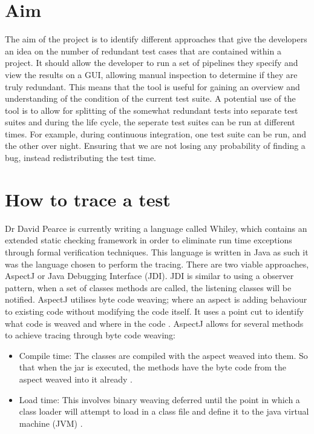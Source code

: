 \section{Aim}

The aim of the project is to identify different approaches that give the developers an idea on the number of redundant test cases that are contained within a project. It should allow the developer to run a set of pipelines they specify and view the results on a GUI, allowing manual inspection to determine if they are truly redundant. This means that the tool is useful for gaining an overview and understanding of the condition of the current test suite. A potential use of the tool is to allow for splitting of the somewhat redundant tests into separate test suites and during the life cycle, the seperate test suites can be run at different times. For example, during continuous integration, one test suite can be run, and the other over night. Ensuring that we are not losing any probability of finding a bug, instead redistributing the test time.

\section{How to trace a test}
Dr David Pearce is currently writing a language called Whiley, which contains an extended static checking framework in order to eliminate run time exceptions through formal verification techniques. This language is written in Java as such it was the language chosen to perform the tracing. There are two viable approaches, AspectJ or Java Debugging Interface (JDI). JDI is similar to using a observer pattern, when a set of classes methods are called, the listening classes will be notified. AspectJ utilises byte code weaving; where an aspect is adding behaviour to existing code without modifying the code itself. It uses a point cut to identify what code is weaved and where in the code \cite{aspectwiki}. AspectJ allows for several methods to achieve tracing through byte code weaving:

\begin{itemize}
\item Compile time:
The classes are compiled with the aspect weaved into them. So that when the jar is executed, the methods have the byte code from the aspect weaved into it already \cite{weaving}.
\item Load time:
This involves binary weaving deferred until the point in which a class loader will attempt to load in a class file and define it to the java virtual machine (JVM) \cite{weaving}.
\end{itemize}

